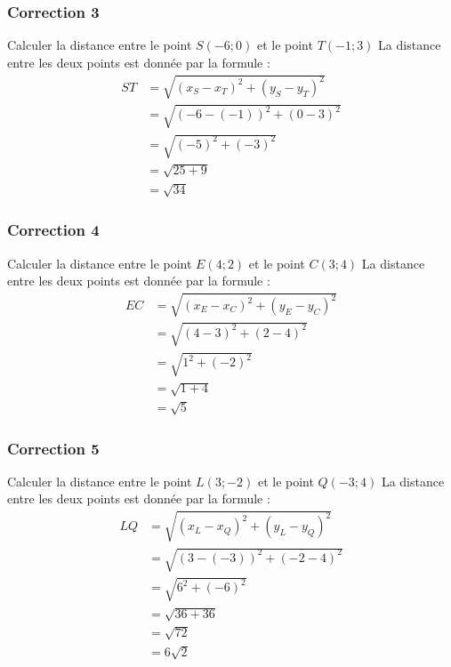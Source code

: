 \documentclass[15pt, mathserif]{beamer}
\begin{document}
\begin{frame}
\vspace{-10mm}
	\frametitle{Correction 3}
Calculer la distance entre le point $S(-6;0)$ et le point $ T(-1;3)$ La distance entre les deux points est donnée par la formule : \begin{align*} ST &=\sqrt{(x_S-x_T)^2 + (y_S-y_T)^2} \\ &= \sqrt{(-6-\left(-1\right))^2 + (0-3)^2} \\ &= \sqrt{\left(-5\right)^2 +\left(-3\right)^2} \\ &= \sqrt{25+9} \\ &= \sqrt{34}  \end{align*}\end{frame}


\begin{frame}
\vspace{-10mm}
	\frametitle{Correction 4}
Calculer la distance entre le point $E(4;2)$ et le point $ C(3;4)$ La distance entre les deux points est donnée par la formule : \begin{align*} EC &=\sqrt{(x_E-x_C)^2 + (y_E-y_C)^2} \\ &= \sqrt{(4-3)^2 + (2-4)^2} \\ &= \sqrt{1^2 +\left(-2\right)^2} \\ &= \sqrt{1+4} \\ &= \sqrt{5}  \end{align*}\end{frame}


\begin{frame}
\vspace{-10mm}
	\frametitle{Correction 5}
Calculer la distance entre le point $L(3;-2)$ et le point $ Q(-3;4)$ La distance entre les deux points est donnée par la formule : \begin{align*} LQ &=\sqrt{(x_L-x_Q)^2 + (y_L-y_Q)^2} \\ &= \sqrt{(3-\left(-3\right))^2 + (-2-4)^2} \\ &= \sqrt{6^2 +\left(-6\right)^2} \\ &= \sqrt{36+36} \\ &= \sqrt{72}  \\ &=6 \sqrt{2} \end{align*}\end{frame}
\end{document}
